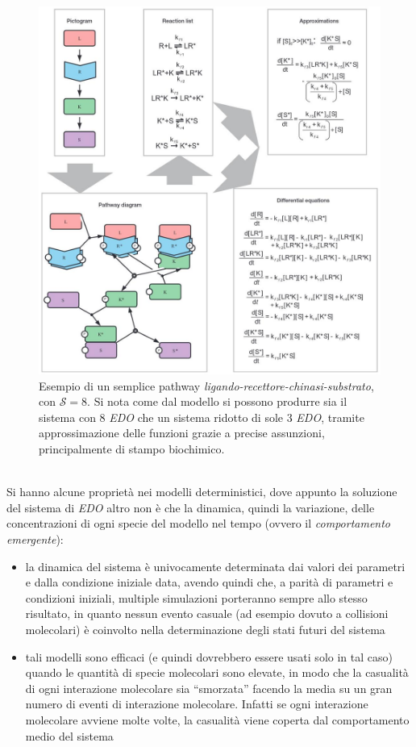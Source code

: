 \documentclass[a4paper,12pt, oneside]{book}
\begin{document}
\begin{figure}
  \centering
  \includegraphics[width = \textwidth]{img/edo1.jpg}
  \caption{Esempio di un semplice pathway
    \textit{ligando-recettore-chinasi-substrato}, con $\mathcal{S}=8$. Si nota
    come dal modello si possono produrre sia il sistema con 8 \textit{EDO} che
    un sistema ridotto di sole 3 \textit{EDO}, tramite approssimazione delle
    funzioni grazie a precise assunzioni, principalmente di stampo biochimico.} 
  \label{fig:edo1}
\end{figure}
\\
\noindent
Si hanno alcune proprietà nei modelli deterministici, dove appunto la soluzione
del sistema di \textit{EDO} altro non è che la dinamica, quindi la variazione,
delle concentrazioni di ogni specie del modello nel tempo (ovvero il
\textit{comportamento emergente}):
\begin{itemize}
  \item la dinamica del sistema è univocamente determinata dai valori dei
  parametri e dalla condizione iniziale data, avendo quindi che, a parità di
  parametri e condizioni iniziali, multiple simulazioni porteranno sempre allo
  stesso risultato, in quanto nessun evento casuale (ad esempio dovuto a
  collisioni molecolari) è coinvolto nella determinazione degli stati futuri del
  sistema  
  \item tali modelli sono efficaci (e quindi dovrebbero essere usati solo in tal
  caso) quando le quantità di specie molecolari sono
  elevate, in modo che la casualità di ogni interazione molecolare sia
  ``smorzata'' facendo la media su un gran numero di eventi di interazione
  molecolare. Infatti se ogni interazione molecolare avviene molte volte, la
  casualità viene coperta dal comportamento medio del sistema 
\end{itemize}
\end{document}
